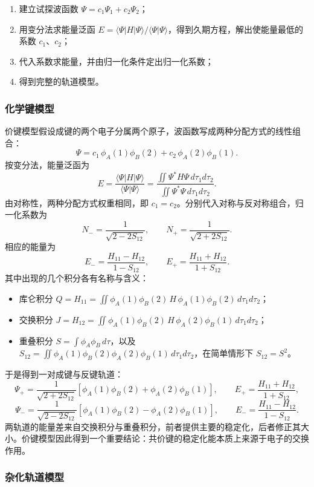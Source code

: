 \documentclass[UTF8]{ctexbook}
\begin{document}
\begin{enumerate}
  \item 建立试探波函数 $\Psi=c_1\Psi_1+c_2\Psi_2$；
  \item 用变分法求能量泛函 $E=\langle\Psi|H|\Psi\rangle/\langle\Psi|\Psi\rangle$，得到久期方程，解出使能量最低的系数 $c_1$、$c_2$；
  \item 代入系数求能量，并由归一化条件定出归一化系数；
  \item 得到完整的轨道模型。
\end{enumerate}

\subsubsection{化学键模型}

价键模型假设成键的两个电子分属两个原子，波函数写成两种分配方式的线性组合：
\[
\Psi=c_1\,\phi_A(1)\phi_B(2)+c_2\,\phi_A(2)\phi_B(1).
\]
按变分法，能量泛函为
\[
E=\frac{\langle\Psi|H|\Psi\rangle}{\langle\Psi|\Psi\rangle}
=\frac{\iint\Psi^*H\Psi\,d\tau_1d\tau_2}
{\iint\Psi^*\Psi\,d\tau_1d\tau_2}.
\]
由对称性，两种分配方式权重相同，即 $c_1=c_2$。分别代入对称与反对称组合，归一化系数为
\[
N_-=\frac{1}{\sqrt{2-2S_{12}}},\qquad
N_+=\frac{1}{\sqrt{2+2S_{12}}}.
\]
相应的能量为
\[
E_-=\frac{H_{11}-H_{12}}{1-S_{12}},\qquad
E_+=\frac{H_{11}+H_{12}}{1+S_{12}}.
\]
其中出现的几个积分各有名称与含义：
\begin{itemize}
  \item 库仑积分 $Q=H_{11}=\iint\phi_A(1)\phi_B(2)\,H\,\phi_A(1)\phi_B(2)\,d\tau_1d\tau_2$；
  \item 交换积分 $J=H_{12}=\iint\phi_A(1)\phi_B(2)\,H\,\phi_A(2)\phi_B(1)\,d\tau_1d\tau_2$；
  \item 重叠积分 $S=\int\phi_A\phi_B\,d\tau$，以及 $S_{12}=\iint\phi_A(1)\phi_B(2)\phi_A(2)\phi_B(1)\,d\tau_1d\tau_2$，在简单情形下 $S_{12}=S^2$。
\end{itemize}
于是得到一对成键与反键轨道：
\[
\Psi_+=\frac{1}{\sqrt{2+2S_{12}}}\left[\phi_A(1)\phi_B(2)+\phi_A(2)\phi_B(1)\right],
\qquad E_+=\frac{H_{11}+H_{12}}{1+S_{12}},
\]
\[
\Psi_-=\frac{1}{\sqrt{2-2S_{12}}}\left[\phi_A(1)\phi_B(2)-\phi_A(2)\phi_B(1)\right],
\qquad E_-=\frac{H_{11}-H_{12}}{1-S_{12}}.
\]
两轨道的能量差来自交换积分与重叠积分，前者提供主要的稳定化，后者修正其大小。价键模型因此得到一个重要结论：共价键的稳定化能本质上来源于电子的交换作用。

\subsubsection{杂化轨道模型}
\end{document}
